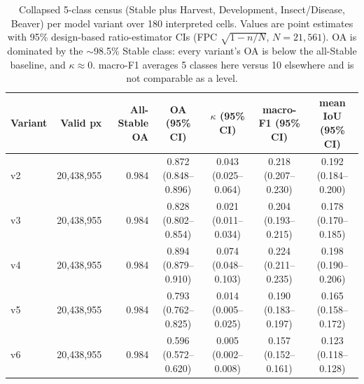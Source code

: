 \begin{table}[t]
\centering
\caption{Collapsed 5-class census (Stable plus Harvest, Development, Insect/Disease, Beaver) per model variant over 180 interpreted cells. Values are point estimates with 95\% design-based ratio-estimator CIs (FPC $\sqrt{1-n/N}$, $N=21{,}561$). OA is dominated by the $\sim$98.5\% Stable class: every variant's OA is below the all-Stable baseline, and $\kappa\approx0$. macro-F1 averages 5 classes here versus 10 elsewhere and is not comparable as a level.}
\label{tab:collapsed5_census}
\begin{tabular}{lrrcccc}
\toprule
Variant & Valid px & All-Stable OA & OA (95\% CI) & $\kappa$ (95\% CI) & macro-F1 (95\% CI) & mean IoU (95\% CI) \\
\midrule
v2 & 20,438,955 & 0.984 & 0.872 (0.848--0.896) & 0.043 (0.025--0.064) & 0.218 (0.207--0.230) & 0.192 (0.184--0.200) \\
v3 & 20,438,955 & 0.984 & 0.828 (0.802--0.854) & 0.021 (0.011--0.034) & 0.204 (0.193--0.215) & 0.178 (0.170--0.185) \\
v4 & 20,438,955 & 0.984 & 0.894 (0.879--0.910) & 0.074 (0.048--0.103) & 0.224 (0.211--0.235) & 0.198 (0.190--0.206) \\
v5 & 20,438,955 & 0.984 & 0.793 (0.762--0.825) & 0.014 (0.005--0.025) & 0.190 (0.183--0.197) & 0.165 (0.158--0.172) \\
v6 & 20,438,955 & 0.984 & 0.596 (0.572--0.620) & 0.005 (0.002--0.008) & 0.157 (0.152--0.161) & 0.123 (0.118--0.128) \\
\bottomrule
\end{tabular}
\end{table}
